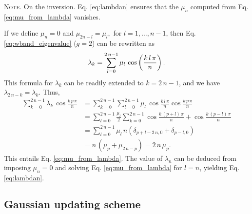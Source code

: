 \documentclass[reprint, superscriptaddress, floatfix]{revtex4-1}
\newcommand{\note}[1]{{\color{DarkGreen}\footnotesize \textsc{Note.} #1}}
\begin{document}
\note{On the inversion.
Eq. \eqref{eq:lambdan}
  ensures that the $\mu_n$
  computed from Eq. \eqref{eq:mu_from_lambda}
  vanishes.

  If we define $\mu_n = 0$ and
  $
    \mu_{ 2 n - l } = \mu_l,
  $
  for
  $l = 1, \dots, n - 1$,
  then Eq. \eqref{eq:wband_eigenvalue} ($g = 2$)
  can be rewritten as
  \begin{align}
    \lambda_k
    =
    \sum_{ l = 0 }^{ 2 \, n - 1 }
    \mu_l \, \cos \left(\frac{ k \, l \, \pi } { n } \right).
  \notag
  \end{align}
  This formula for $\lambda_k$
  can be readily extended to $k = 2 \, n - 1$,
  and we have
  $
    \lambda_{ 2 \, n - k } = \lambda_k
    .
  $
  Thus,
  \begin{align*}
    \sum_{ k = 0 }^{ 2 \, n - 1 }
      \lambda_k \,
      \cos \frac{ k \, p \, \pi }
                {      n        }
    &=
    \sum_{ k = 0 }^{ 2 \, n - 1 }
      \sum_{ l = 0 }^{ 2 \, n - 1 }
        \mu_l \,
        \cos \frac{ k \, l \, \pi }
                  {      n        }
        \cos \frac{ k \, p \, \pi }
                  {      n        }
    \\
    &=
    \sum_{ l = 0 }^{ 2 \, n - 1 }
      \frac{ \mu_l } { 2 }
      \sum_{ k = 0 }^{ 2 \, n - 1 }
        \cos \frac{ k \, (p + l) \, \pi }
                  {      n        }
                  +
        \cos \frac{ k \, (p - l) \, \pi }
                  {      n        }
    \\
    &=
    \sum_{ l = 0 }^{ 2 \, n - 1 }
      \mu_l \, n \left(
        \delta_{ p + l - 2 \, n, 0 }
        +
        \delta_{ p - l, 0 }
      \right)
    \\
    &=
    n \, \left( \mu_p + \mu_{ 2 \, n - p} \right)
    =
    2 \, n \, \mu_p.
  \end{align*}
  This entails Eq. \eqref{eq:mu_from_lambda}.
  The value of $\lambda_n$
  can be deduced from
  imposing $\mu_n = 0$
  and solving Eq. \eqref{eq:mu_from_lambda}
  for $l = n$,
  yielding Eq. \eqref{eq:lambdan}.
}






\subsection{Gaussian updating scheme}
\end{document}
